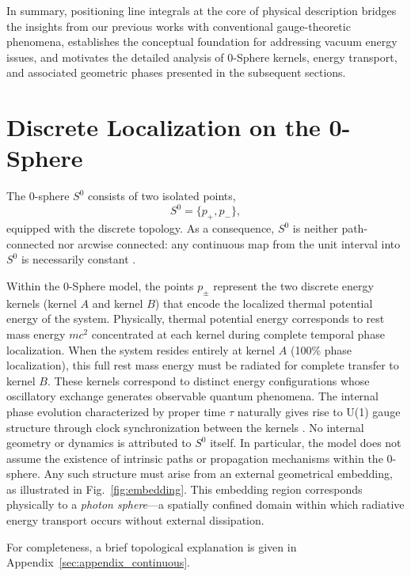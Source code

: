 \documentclass[%
 reprint,
 amsmath,amssymb,
 aps,
 prb,
]{revtex4-2}
\numberwithin{equation}{section}
\begin{document}
\medskip
In summary, positioning line integrals at the core of physical description bridges the insights from our previous works with conventional gauge-theoretic phenomena, establishes the conceptual foundation for addressing vacuum energy issues, and motivates the detailed analysis of 0-Sphere kernels, energy transport, and associated geometric phases presented in the subsequent sections.

\section{Discrete Localization on the 0-Sphere}
\label{sec:zerosphere}

The 0-sphere $S^{0}$ consists of two isolated points,
\begin{equation}
S^{0} = \{p_{+}, p_{-}\},
\end{equation}
equipped with the discrete topology.
As a consequence, $S^{0}$ is neither path-connected nor arcwise connected: any continuous map from the unit interval into $S^{0}$ is necessarily constant \cite{Munkres2000}.

Within the 0-Sphere model, the points $p_{\pm}$ represent the two discrete energy kernels (kernel $A$ and kernel $B$) that encode the localized thermal potential energy of the system.
Physically, thermal potential energy corresponds to rest mass energy $mc^2$ concentrated at each kernel during complete temporal phase localization.
When the system resides entirely at kernel $A$ (100\% phase localization), this full rest mass energy must be radiated for complete transfer to kernel $B$.
These kernels correspond to distinct energy configurations whose oscillatory exchange generates observable quantum phenomena.
The internal phase evolution characterized by proper time $\tau$ naturally gives rise to U(1) gauge structure through clock synchronization between the kernels \cite{hanamura17765136}.
No internal geometry or dynamics is attributed to $S^{0}$ itself.
In particular, the model does not assume the existence of intrinsic paths or propagation mechanisms within the 0-sphere.
Any such structure must arise from an external geometrical embedding, as illustrated in Fig.~\ref{fig:embedding}.
This embedding region corresponds physically to a \textit{photon sphere}—a spatially confined domain within which radiative energy transport occurs without external dissipation.

For completeness, a brief topological explanation is given in Appendix~\ref{sec:appendix_continuous}.
\end{document}
